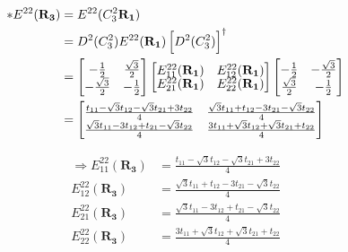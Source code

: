 \documentclass{article}
\begin{document}
\begin{align*}
    \ast E^{22}(\mathbf{R_3}) & = E^{22}(C_3^2\mathbf{ R_1})                                                                                                   \\
                              & = D^2(C_3^2)  E^{22}(\mathbf{R_1}) \left[ D^2(C_3^2) \right]^\dagger                                                           \\
                              &
    =
    \begin{bmatrix}
        \renewcommand{\arraystretch}{0.72}
        -\frac{1}{2}        & \frac{\sqrt{3}}{2} \\
        -\frac{\sqrt{3}}{2} & -\frac{1}{2}
    \end{bmatrix}
    \begin{bmatrix}
        E_{11}^{22}(\mathbf{R_1}) & E_{12}^{22}(\mathbf{R_1}) \\
        E_{21}^{22}(\mathbf{R_1}) & E_{22}^{22}(\mathbf{R_1})
    \end{bmatrix}
    \begin{bmatrix}
        -\frac{1}{2}       & -\frac{\sqrt{3}}{2} \\
        \frac{\sqrt{3}}{2} & -\frac{1}{2}
    \end{bmatrix}                                                                                                   \\
                              & = \begin{bmatrix}
                                      \frac{t_{11} - \sqrt{3}t_{12} - \sqrt{3}t_{21} + 3t_{22}}{4} & \frac{\sqrt{3}t_{11} + t_{12} - 3 t_{21} - \sqrt{3}t_{22}}{4} \\
                                      \frac{\sqrt{3}t_{11} - 3t_{12} + t_{21} - \sqrt{3}t_{22}}{4} & \frac{3t_{11} + \sqrt{3}t_{12} + \sqrt{3}t_{21} + t_{22}}{4}
                                  \end{bmatrix}
\end{align*}

\begin{align*}
    \Rightarrow E_{11}^{22}(\mathbf{R_3}) & = \frac{t_{11} - \sqrt{3}t_{12} - \sqrt{3}t_{21} + 3t_{22}}{4} \\
    E_{12}^{22}(\mathbf{R_3})             & = \frac{\sqrt{3}t_{11} + t_{12} - 3 t_{21} -\sqrt{3}t_{22}}{4} \\
    E_{21}^{22}(\mathbf{R_3})             & = \frac{\sqrt{3}t_{11} - 3t_{12} + t_{21} - \sqrt{3}t_{22}}{4} \\
    E_{22}^{22}(\mathbf{R_3})             & = \frac{3t_{11} + \sqrt{3}t_{12} + \sqrt{3}t_{21} + t_{22}}{4} \\
\end{align*}
\end{document}
